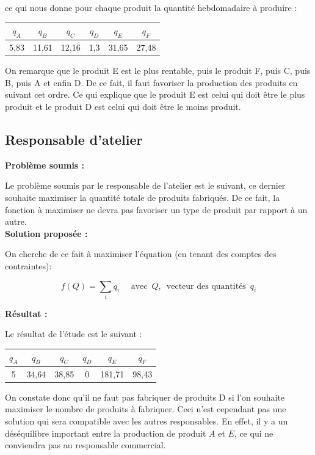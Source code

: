 \documentclass[paper=a4, fontsize=11pt]{scrartcl}
\numberwithin{equation}{section}		%
\numberwithin{figure}{section}			%
\numberwithin{table}{section}				%
\renewcommand{\bf}[1]{\textbf{#1}}
\begin{document}
ce qui nous donne pour chaque produit la quantité hebdomadaire à produire :
\begin{center}
\begin{tabular}{cccccc}
\hline
$q_A$ & $q_B$ & $q_C$ & $q_D$ & $q_E$ & $q_F$ \\
\hline
5,83 & 11,61 & 12,16 & 1,3 & 31,65 & 27,48 \\
\hline
\end{tabular}
\end{center}

On remarque que le produit E est le plus rentable, puis le produit F, puis C, puis B, puis A et enfin D. De ce fait, il faut favoriser la production des produits en suivant cet ordre. Ce qui explique que le produit E est celui qui doit être le plus produit et le produit D est celui qui doit être le moins produit.


\subsection{Responsable d'atelier}
\bf{Problème soumis :}

Le problème soumis par le responsable de l'atelier est le suivant, ce dernier souhaite maximiser la quantité totale de produits fabriqués. De ce fait, la fonction à maximiser ne devra pas favoriser un type de produit par rapport à un autre.\\

\bf{Solution proposée :}

On cherche de ce fait à maximiser l'équation (en tenant des comptes des contraintes):

\[f(Q) = \sum_i q_i \quad \text{  avec } \, Q, \, \text{ vecteur des quantités } \, q_i \]

\bf{Résultat :}

Le résultat de l'étude est le suivant : 

\begin{center}
\begin{tabular}{cccccc}
\hline 
$q_A$ & $q_B$ & $q_C$ & $q_D$ & $q_E$ & $q_F$ \\ 
\hline 
5 & 34,64 & 38,85 & 0 & 181,71 & 98,43 \\ 
\hline 
\end{tabular} 
\end{center}

On constate donc qu'il ne faut pas fabriquer de produits D si l'on souhaite maximiser le nombre de produits à fabriquer. Ceci n'est cependant pas une solution qui sera compatible avec les autres responsables. En effet, il y a un déséquilibre important entre la production de produit $A$ et $E$, ce qui ne conviendra pas au responsable commercial.
\end{document}

